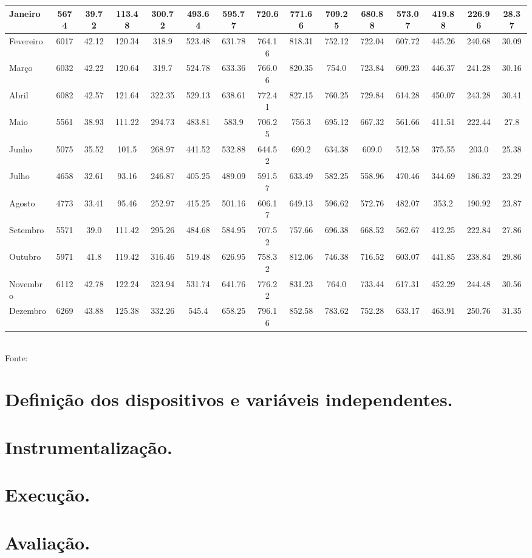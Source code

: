 \begin{table}[h]
\begin{tabular}{l c | *{13}{c} }
	\hline
	Janeiro & 5674 & 39.72 & 113.48 & 300.72 & 493.64 & 595.77 & 720.6 & 771.66 & 709.25 & 680.88 & 573.07 & 419.88 & 226.96 & 28.37 \\
	\hline
	Fevereiro & 6017 & 42.12 & 120.34 & 318.9 & 523.48 & 631.78 & 764.16 & 818.31 & 752.12 & 722.04 & 607.72 & 445.26 & 240.68 & 30.09\\
	\hline
	Março & 6032 &  42.22 & 120.64 & 319.7 & 524.78 & 633.36 & 766.06 & 820.35 & 754.0 & 723.84 & 609.23 & 446.37 & 241.28 & 30.16\\
	\hline
	Abril & 6082 & 42.57 & 121.64 & 322.35 & 529.13 & 638.61 & 772.41 & 827.15 & 760.25 & 729.84 & 614.28 & 450.07 & 243.28 & 30.41 \\
	\hline
	Maio & 5561 & 38.93 & 111.22 & 294.73 & 483.81 & 583.9 & 706.25 & 756.3 & 695.12 & 667.32 & 561.66 & 411.51 & 222.44 & 27.8 \\
	\hline
	Junho & 5075 & 35.52 & 101.5 & 268.97 & 441.52 & 532.88 & 644.52 & 690.2 & 634.38 & 609.0 & 512.58 & 375.55 & 203.0 & 25.38 \\
	\hline
	Julho & 4658 & 32.61 & 93.16 & 246.87 & 405.25 & 489.09 & 591.57 & 633.49 & 582.25 & 558.96 & 470.46 & 344.69 & 186.32 & 23.29 \\
	\hline
	Agosto & 4773 & 33.41 & 95.46 & 252.97 & 415.25 & 501.16 & 606.17 & 649.13 & 596.62 & 572.76 & 482.07 & 353.2 & 190.92 & 23.87 \\
	\hline
	Setembro & 5571 & 39.0 & 111.42 & 295.26 & 484.68 & 584.95 & 707.52 & 757.66 & 696.38 & 668.52 & 562.67 & 412.25 & 222.84 & 27.86 \\
	\hline
	Outubro & 5971 & 41.8 & 119.42 & 316.46 & 519.48 & 626.95 & 758.32 & 812.06 & 746.38 & 716.52 & 603.07 & 441.85 & 238.84 & 29.86 \\
	\hline
	Novembro & 6112 & 42.78 & 122.24 & 323.94 & 531.74 & 641.76 & 776.22 & 831.23 & 764.0 & 733.44 & 617.31 & 452.29 & 244.48 & 30.56 \\
	\hline
	Dezembro & 6269 & 43.88 & 125.38 & 332.26 & 545.4 & 658.25 & 796.16 & 852.58 & 783.62 & 752.28 & 633.17 & 463.91 & 250.76 & 31.35 \\
\bottomrule
\end{tabular}
\label{table:cap6distribuicaonatal}
\\
\footnotesize Fonte:\cite{martins2017atlas}

\end{table}
\endgroup



\section{Definição dos dispositivos e variáveis independentes.}
\section{Instrumentalização.}
\section{Execução.}
\section{Avaliação.}
 